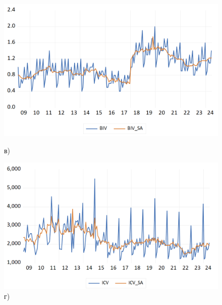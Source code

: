 \documentclass[a4paper, 14pt]{extreport}
\numberwithin{equation}{subsection}
\numberwithin{equation}{section}
\begin{document}
\begin{figure}[h]
		\begin{minipage}{0.5\textwidth}
			\centering
		\includegraphics[scale=0.25]{images/img04}
			\caption*{в)}
		\end{minipage}%
		\hfill %
		\begin{minipage}{0.5\textwidth}
			\centering
		\includegraphics[scale=0.25]{images/img05}
			\caption*{г)}
		\end{minipage}%
		

\end{figure}
\end{document}

